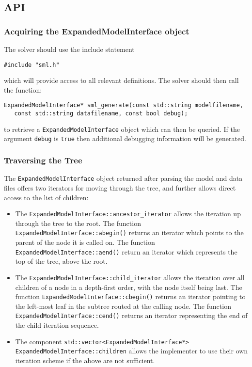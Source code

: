 \documentclass[10pt,a4paper]{book}
\begin{document}
\subsection{API}

\subsubsection{Acquiring the ExpandedModelInterface object}
The solver should use the include statement
\begin{verbatim}
#include "sml.h"
\end{verbatim}
which will provide access to all relevant definitions. The solver should then
call the function:

\begin{verbatim}
ExpandedModelInterface* sml_generate(const std::string modelfilename, 
   const std::string datafilename, const bool debug);
\end{verbatim}
to retrieve a {\tt ExpandedModelInterface} object which can then be queried.
If the argument {\tt debug} is {\tt true} then additional debugging information
will be generated.

\subsubsection{Traversing the Tree}
The {\tt ExpandedModelInterface} object returned after parsing the model and
data files offers two iterators for moving through the tree, and further allows
direct access to the list of children:

\begin{itemize}
\item The {\tt ExpandedModelInterface::ancestor\_iterator} allows the iteration
up through the tree to the root. The function
{\tt ExpandedModelInterface::abegin()} returns an
iterator which points to the parent of the node it is called on. The function
{\tt ExpandedModelInterface::aend()} return an iterator which represents the
top of the tree, above the root.

\item The {\tt ExpandedModelInterface::child\_iterator} allows the iteration over all
children of a node in a depth-first order, with the node itself being last. The
function {\tt ExpandedModelInterface::cbegin()} returns an iterator pointing to
the left-most leaf in the subtree routed at the calling node. The function 
{\tt ExpandedModelInterface::cend()} returns an iterator representing the end
of the child iteration sequence.

\item The component
{\tt std::vector<ExpandedModelInterface*> ExpandedModelInterface::children}
allows the implementer to use their own iteration scheme if the above are not
sufficient.
\end{itemize}
\end{document}
